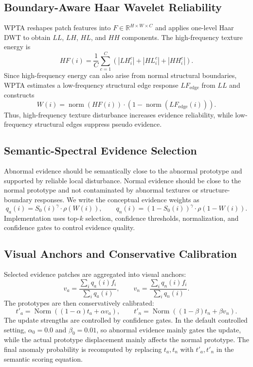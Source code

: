 \documentclass[runningheads]{llncs}
\newcommand{\normop}{\operatorname{norm}}
\begin{document}
\subsection{Boundary-Aware Haar Wavelet Reliability}

WPTA reshapes patch features into $F\in\mathbb{R}^{H\times W\times C}$ and applies one-level Haar DWT to obtain $LL$, $LH$, $HL$, and $HH$ components. The high-frequency texture energy is
\begin{equation}
HF(i)=\frac{1}{C}\sum_{c=1}^{C}\left(|LH_i^c|+|HL_i^c|+|HH_i^c|\right).
\end{equation}
Since high-frequency energy can also arise from normal structural boundaries, WPTA estimates a low-frequency structural edge response $LF_{\mathrm{edge}}$ from $LL$ and constructs
\begin{equation}
W(i)=\normop(HF(i))\cdot\left(1-\normop(LF_{\mathrm{edge}}(i))\right).
\end{equation}
Thus, high-frequency texture disturbance increases evidence reliability, while low-frequency structural edges suppress pseudo evidence.

\subsection{Semantic-Spectral Evidence Selection}

Abnormal evidence should be semantically close to the abnormal prototype and supported by reliable local disturbance. Normal evidence should be close to the normal prototype and not contaminated by abnormal textures or structure-boundary responses. We write the conceptual evidence weights as
\begin{equation}
q_a(i)=S_0(i)^\gamma\cdot\rho(W(i)),\qquad
q_n(i)=(1-S_0(i))^\gamma\cdot\rho(1-W(i)).
\end{equation}
Implementation uses top-$k$ selection, confidence thresholds, normalization, and confidence gates to control evidence quality.

\subsection{Visual Anchors and Conservative Calibration}

Selected evidence patches are aggregated into visual anchors:
\begin{equation}
v_a=\frac{\sum_i q_a(i)f_i}{\sum_i q_a(i)},\qquad
v_n=\frac{\sum_i q_n(i)f_i}{\sum_i q_n(i)}.
\end{equation}
The prototypes are then conservatively calibrated:
\begin{equation}
t'_a=\operatorname{Norm}\left((1-\alpha)t_a+\alpha v_a\right),\qquad
t'_n=\operatorname{Norm}\left((1-\beta)t_n+\beta v_n\right).
\end{equation}
The update strengths are controlled by confidence gates. In the default controlled setting, $\alpha_0=0.0$ and $\beta_0=0.01$, so abnormal evidence mainly gates the update, while the actual prototype displacement mainly affects the normal prototype. The final anomaly probability is recomputed by replacing $t_a,t_n$ with $t'_a,t'_n$ in the semantic scoring equation.
\end{document}
